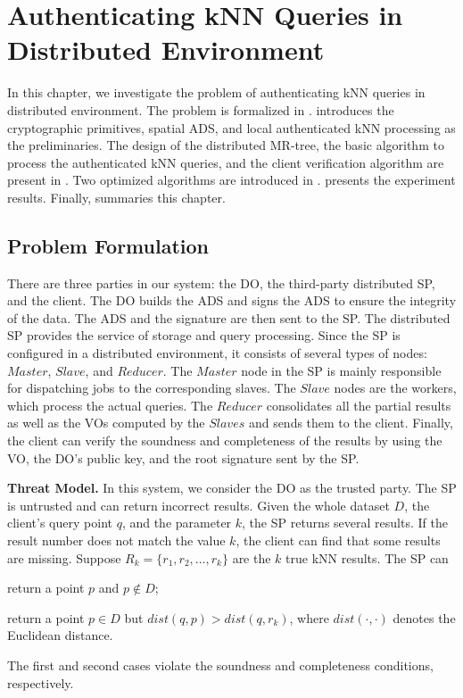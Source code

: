 \chapter{Authenticating {kNN} Queries in Distributed Environment}\label{chap:knn}

In this chapter, we investigate the problem of authenticating {kNN} queries in distributed environment. The problem is formalized in .  introduces the cryptographic primitives, spatial ADS, and local authenticated kNN processing as the preliminaries. The design of the distributed MR-tree, the basic algorithm to process the authenticated kNN queries, and the client verification algorithm are present in . Two optimized algorithms are introduced in .  presents the experiment results. Finally,  summaries this chapter.

\section{Problem Formulation}\label{sec:knn:problem}

There are three parties in our system: the DO, the third-party distributed SP, and the client. The DO builds the ADS and signs the ADS to ensure the integrity of the data. The ADS and the signature are then sent to the SP\@. The distributed SP provides the service of storage and query processing. Since the SP is configured in a distributed environment, it consists of several types of nodes: $Master$, $Slave$, and $Reducer$. The $Master$ node in the SP is mainly responsible for dispatching jobs to the corresponding slaves. The $Slave$ nodes are the workers, which process the actual queries. The $Reducer$ consolidates all the partial results as well as the VOs computed by the $Slaves$ and sends them to the client. Finally, the client can verify the soundness and completeness of the results by using the VO, the DO's public key, and the root signature sent by the SP\@.

\textbf{Threat Model.}
In this system, we consider the DO as the trusted party. The SP is untrusted and can return incorrect results. Given the whole dataset $D$, the client's query point $q$, and the parameter $k$, the SP returns several results. If the result number does not match the value $k$, the client can find that some results are missing. Suppose $R_{k}=\{r_{1},r_{2},\dots,r_{k}\}$ are the $k$ true kNN results. The SP can
\begin{inlineenum}
\item return a point $p$ and $p \notin D$;
\item return a point $p \in D$ but $dist(q,p) > dist(q,r_{k})$, where $dist(\cdot,\cdot)$ denotes the Euclidean distance.
\end{inlineenum}
The first and second cases violate the soundness and completeness conditions, respectively.

